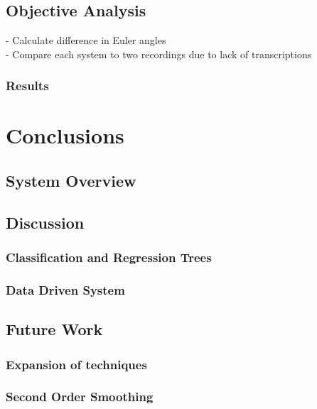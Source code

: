 \documentclass[bsc,frontabs,twoside,singlespacing,parskip]{infthesis}
\begin{document}
\section{Objective Analysis}

- Calculate difference in Euler angles\\
- Compare each system to two recordings due to lack of transcriptions\\

\subsection{Results}
\chapter{Conclusions}

\section{System Overview}

\section{Discussion}

\subsection{Classification and Regression Trees}

\subsection{Data Driven System}

\section{Future Work}

\subsection{Expansion of techniques}

\subsection{Second Order Smoothing}
	


\end{document}
